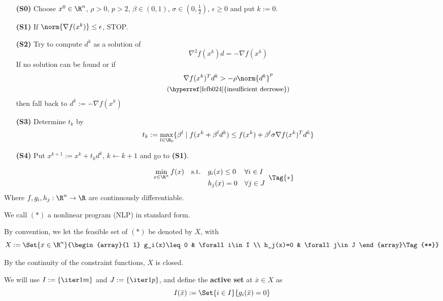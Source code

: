 \begin{enumerate}
	\item [\textbf{(S0)}] Choose $x^0\in\R^n$, $\rho>0$, $p>2$, $\beta\in(0,1)$, $\sigma\in(0,\frac12)$, $\epsilon\geq0$ and put $k:=0$.
	\item [\textbf{(S1)}] If $\norm{\nabla f(x^k)}\leq\epsilon$, STOP.
	\item [\textbf{(S2)}] Try to compute $d^k$ as a solution of
	      $$\nabla^2f(x^k)d=-\nabla f(x^k)$$
	      If no solution can be found or if
	      \begin{gather*}
		      \nabla f(x^k)^Td^k>-\rho\norm{d^k}^p\\
		      \text{\small{(\hyperref[fefb024]{insufficient decrease})}}
	      \end{gather*}
	      then fall back to $d^k:=-\nabla f(x^k)$
	\item [\textbf{(S3)}] Determine $t_k$ by
	      $$t_k:=\max_{l\in\N_0}\{\beta^l\mid f(x^k+\beta^ld^k)\leq f(x^k)+\beta^l\sigma\nabla f(x^k)^Td^k\}$$
	\item [\textbf{(S4)}] Put $x^{k+1}:=x^k+t_kd^k$, $k\gets k+1$ and go to \textbf{(S1)}.
\end{enumerate}

\label{bbe9993}

\begin{equation*}
	\begin{array}{l l l l}
		\displaystyle \min_{x\in\R^n}f(x)
		 & \text{s.t.} & g_i(x)\leq0 & \forall i\in I \\
		 &             & h_j(x)=0    & \forall j\in J
	\end{array}\Tag{*}
\end{equation*}
Where $f,g_i,h_j:\R^n\to\R$ are continuously differentiable.

We call $(*)$ a nonlinear program (NLP) in standard form.

By convention, we let the feasible set of $(*)$ be denoted by $X$, with
\begin{equation*}
	X:=\Set{x\in\R^n}{\begin{array}{l l}
			g_i(x)\leq0 & \forall i\in I \\
			h_j(x)=0    & \forall j\in J
		\end{array}\Tag{**}}
\end{equation*}

By the continuity of the constraint functions, $X$ is closed.

We will use $I:=\{\iter1m\}$ and $J:=\{\iter1p\}$, and define the
\textbf{active set} at $\bar x\in X$ as
$$
	I(\bar x):=\Set{i\in I}{g_i(\bar x)=0}
$$

